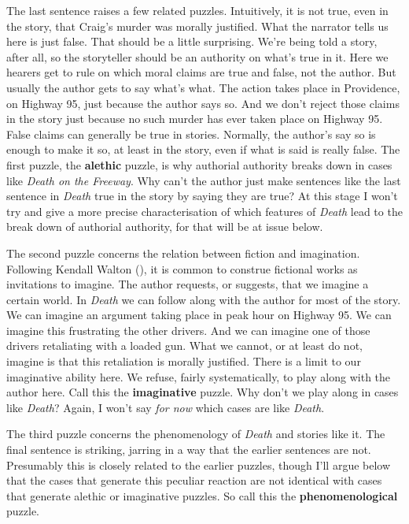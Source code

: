 \documentclass[
  11pt,
  letterpaper,
  DIV=11,
  numbers=noendperiod,
  twoside]{scrartcl}
\begin{document}
The last sentence raises a few related puzzles. Intuitively, it is not
true, even in the story, that Craig's murder was morally justified. What
the narrator tells us here is just false. That should be a little
surprising. We're being told a story, after all, so the storyteller
should be an authority on what's true in it. Here we hearers get to rule
on which moral claims are true and false, not the author. But usually
the author gets to say what's what. The action takes place in
Providence, on Highway 95, just because the author says so. And we don't
reject those claims in the story just because no such murder has ever
taken place on Highway 95. False claims can generally be true in
stories. Normally, the author's say so is enough to make it so, at least
in the story, even if what is said is really false. The first puzzle,
the \textbf{alethic} puzzle, is why authorial authority breaks down in
cases like \emph{Death on the Freeway}. Why can't the author just make
sentences like the last sentence in \emph{Death} true in the story by
saying they are true? At this stage I won't try and give a more precise
characterisation of which features of \emph{Death} lead to the break
down of authorial authority, for that will be at issue below.

The second puzzle concerns the relation between fiction and imagination.
Following Kendall Walton (), it is common
to construe fictional works as invitations to imagine. The author
requests, or suggests, that we imagine a certain world. In \emph{Death}
we can follow along with the author for most of the story. We can
imagine an argument taking place in peak hour on Highway 95. We can
imagine this frustrating the other drivers. And we can imagine one of
those drivers retaliating with a loaded gun. What we cannot, or at least
do not, imagine is that this retaliation is morally justified. There is
a limit to our imaginative ability here. We refuse, fairly
systematically, to play along with the author here. Call this the
\textbf{imaginative} puzzle. Why don't we play along in cases like
\emph{Death}? Again, I won't say \emph{for now} which cases are like
\emph{Death}.

The third puzzle concerns the phenomenology of \emph{Death} and stories
like it. The final sentence is striking, jarring in a way that the
earlier sentences are not. Presumably this is closely related to the
earlier puzzles, though I'll argue below that the cases that generate
this peculiar reaction are not identical with cases that generate
alethic or imaginative puzzles. So call this the
\textbf{phenomenological} puzzle.
\end{document}
